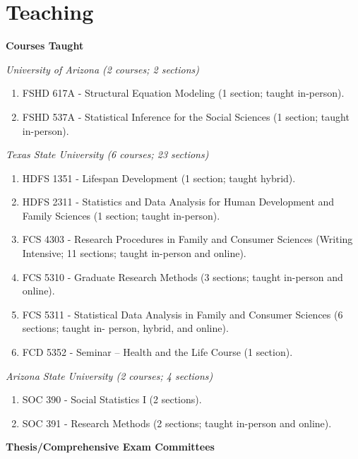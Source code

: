 \documentclass[
]{article}
\providecommand{\tightlist}{%
  \setlength{\itemsep}{0pt}\setlength{\parskip}{0pt}}
\begin{document}
\hypertarget{teaching}{%
\section{\texorpdfstring{\textbf{Teaching}}{Teaching}}\label{teaching}}

\textbf{Courses Taught}

\emph{University of Arizona (2 courses; 2 sections)}

\begin{enumerate}
\def\labelenumi{\arabic{enumi}.}
\tightlist
\item
  FSHD 617A - Structural Equation Modeling (1 section; taught
  in-person).
\item
  FSHD 537A - Statistical Inference for the Social Sciences (1 section;
  taught in-person).
\end{enumerate}

\emph{Texas State University (6 courses; 23 sections)}

\begin{enumerate}
\def\labelenumi{\arabic{enumi}.}
\item
  HDFS 1351 - Lifespan Development (1 section; taught hybrid).
\item
  HDFS 2311 - Statistics and Data Analysis for Human Development and
  Family Sciences (1 section; taught in-person).
\item
  FCS 4303 - Research Procedures in Family and Consumer Sciences
  (Writing Intensive; 11 sections; taught in-person and online).
\item
  FCS 5310 - Graduate Research Methods (3 sections; taught in-person and
  online).
\item
  FCS 5311 - Statistical Data Analysis in Family and Consumer Sciences
  (6 sections; taught in- person, hybrid, and online).
\item
  FCD 5352 - Seminar -- Health and the Life Course (1 section).
\end{enumerate}

\emph{Arizona State University (2 courses; 4 sections)}

\begin{enumerate}
\def\labelenumi{\arabic{enumi}.}
\item
  SOC 390 - Social Statistics I (2 sections).
\item
  SOC 391 - Research Methods (2 sections; taught in-person and online).
\end{enumerate}

\textbf{Thesis/Comprehensive Exam Committees}
\end{document}
